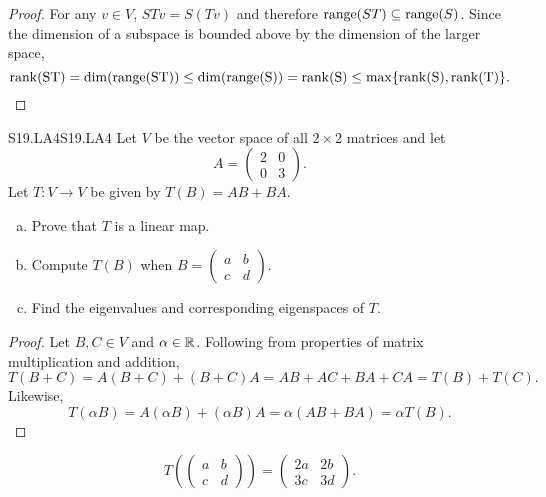 \documentclass[../AlgebraQualSolutions.tex]{subfiles}
\begin{document}
	\begin{proof}
		For any $v \in V$, $STv = S(Tv)$ and therefore $\mathrm{range}(ST) \subseteq \mathrm{range}(S)$. Since the dimension of a subspace is bounded above by the dimension of the larger space,
			\[\rm{rank}(ST) = \dim(\mathrm{range}(ST)) \leq \dim(\mathrm{range}(S)) = \rm{rank}(S) \leq \max\{\rm{rank}(S),\rm{rank}(T)\}.\]
	\end{proof}

	\begin{prob}{S19.LA4}{S19.LA4}
		Let $V$ be the vector space of all $2 \times 2$ matrices and let 
			\[A = \begin{pmatrix} 2 & 0\\ 0 & 3 \end{pmatrix}. \]
		Let $T: V \to V$ be given by $T(B) = AB + BA$.

		\begin{enumerate}[(a)]
			\item Prove that $T$ is a linear map.
			\item Compute $T(B)$ when $B = \begin{pmatrix} a & b \\ c & d \end{pmatrix}$.
			\item Find the eigenvalues and corresponding eigenspaces of $T$.
		\end{enumerate}
	\end{prob}

	\begin{proof}
		Let $B,C \in V$ and $\alpha \in \mathbb{R}$. Following from properties of matrix multiplication and addition,
			\[T(B + C) = A(B+C) + (B+C)A = AB + AC + BA + CA = T(B) + T(C).\]
		Likewise,
			\[T(\alpha B) = A(\alpha B) + (\alpha B)A = \alpha(AB +BA) = \alpha T(B).\]
	\end{proof}

	\begin{solution}
		\[T\left(\begin{pmatrix} a & b \\ c & d \end{pmatrix}\right) = \begin{pmatrix} 2a & 2b \\ 3c & 3d \end{pmatrix}.\]
	\end{solution}
\end{document}
